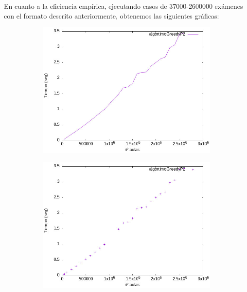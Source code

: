 \documentclass{article}
\begin{document}
    En cuanto a la eficiencia empírica, ejecutando casos de 37000-2600000 exámenes con el formato descrito anteriormente, obtenemos las siguientes gráficas:

    \begin{figure}[H]
    \begin{subfigure}{0.4\textwidth}
        \centering
        \includegraphics[scale = 0.40]{Problema2/imagenes/GraficaLineas.jpeg}
    \end{subfigure} \hfill
    \begin{subfigure}{0.4\textwidth}
        \centering
        \includegraphics[scale = 0.40]{Problema2/imagenes/GraficaPuntos.jpeg}
    \end{subfigure}
    \end{figure}
\end{document}
